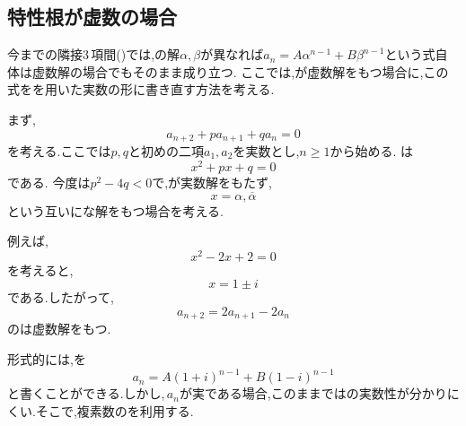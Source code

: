 \subsection{特性根が虚数の場合}\label{節：虚数解型隣接3項間漸化式}

  今までの隣接3\,項間()では,の解$\alpha,\beta$が異なれば$a_n=A\alpha^{n-1}+B\beta^{n-1}$という式自体は虚数解の場合でもそのまま成り立つ.
  ここでは,が虚数解をもつ場合に,この式をを用いた実数の形に書き直す方法を考える.

  まず,
  \[
    a_{n+2}+pa_{n+1}+qa_n=0
  \]
  を考える.ここでは$p,q$と初めの二項$a_1,a_2$を実数とし,$n\ge1$から始める.
  は
  \[
    x^2+px+q=0
  \]
  である.
  今度は$p^2-4q<0$で,が実数解をもたず,
  \[
    x=\alpha,\overline{\alpha}
  \]
  という互いにな解をもつ場合を考える.

  例えば,
  \[
    x^2-2x+2=0
  \]
  を考えると,
  \[
    x=1\pm i
  \]
  である.したがって,
  \[
    a_{n+2}=2a_{n+1}-2a_n
  \]
  のは虚数解をもつ.

  形式的には,を
  \[
    a_n=A(1+i)^{n-1}+B(1-i)^{n-1}
  \]
  と書くことができる.しかし,\,$a_n$が実である場合,このままではの実数性が分かりにくい.そこで,複素数のを利用する.

